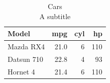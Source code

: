 \begin{table}[t]
\caption*{
{\fontsize{20}{25}\selectfont  Cars\fontsize{12}{15}\selectfont } \\ 
{\fontsize{14}{17}\selectfont  A subtitle\fontsize{12}{15}\selectfont }
} 
\fontsize{12.0pt}{14.0pt}\selectfont
\begin{tabular*}{\linewidth}{@{\extracolsep{\fill}}lrrr}
\toprule
{\bfseries Model} & {\bfseries mpg} & {\bfseries cyl} & {\bfseries hp} \\ 
\midrule\addlinespace[2.5pt]
Mazda RX4 & 21.0 & 6 & 110 \\ 
Datsun 710 & 22.8 & 4 & 93 \\ 
Hornet 4 & 21.4 & 6 & 110 \\ 
\bottomrule
\end{tabular*}
\end{table}

